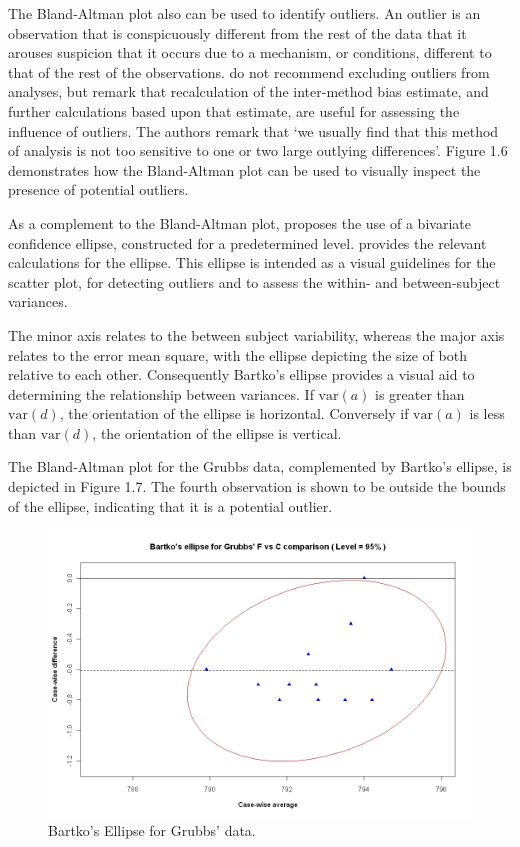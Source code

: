 \documentclass[12pt, a4paper]{report}
\theoremstyle{plain}
\theoremstyle{definition}
\theoremstyle{remark}
\begin{document}
	
	The Bland-Altman plot also can be used to identify outliers. An
	outlier is an observation that is conspicuously different from the
	rest of the data that it arouses suspicion that it occurs due to a
	mechanism, or conditions, different to that of the rest of the
	observations. \citet*{BA99} do not recommend excluding outliers from analyses,
	but remark that recalculation of the inter-method bias estimate,
	and further calculations based upon that estimate, are useful for
	assessing the influence of outliers. The authors remark that `we
	usually find that this method of analysis is not too sensitive to
	one or two large outlying differences'. Figure 1.6 demonstrates how the Bland-Altman
	plot can be used to visually inspect the presence of potential
	outliers.
	
	As a complement to the Bland-Altman plot, \citet{Bartko} proposes
	the use of a bivariate confidence ellipse, constructed for a
	predetermined level. \citet{AltmanEllipse} provides the relevant calculations for the
	ellipse. This ellipse is intended as a visual
	guidelines for the scatter plot, for detecting outliers and to
	assess the within- and between-subject variances.
	
	The minor axis relates to the between subject variability, whereas
	the major axis relates to the error mean square, with the ellipse
	depicting the size of both relative to each other.
	Consequently Bartko's ellipse provides a visual aid to determining the
	relationship between variances. If $\mbox{var}(a)$ is greater than $\mbox{var}(d)$, the orientation of the ellipse is horizontal. Conversely if $\mbox{var}(a)$ is less than $\mbox{var}(d)$, the orientation of the ellipse is vertical.
	
	
	
	The Bland-Altman plot for the Grubbs data, complemented by Bartko's ellipse, is depicted in Figure 1.7.
	The fourth observation is shown to be outside the bounds of the ellipse, indicating that it is a potential outlier.
	
	
	\begin{figure}[h!]
		\includegraphics[width=130mm]{images/GrubbsBartko.jpeg}
		\caption{Bartko's Ellipse for Grubbs' data.}\label{GrubbsBartko}
	\end{figure}
	
\end{document}
